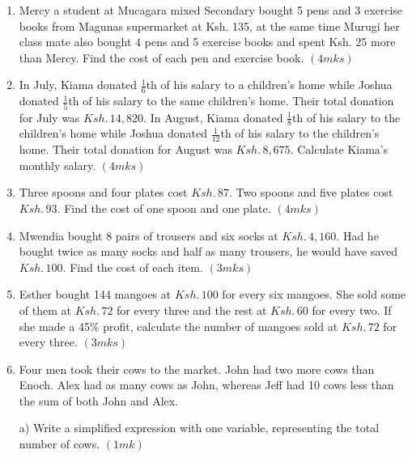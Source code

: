 \documentclass[
  letterpaper,
  DIV=11,
  numbers=noendperiod]{scrreprt}
\begin{document}
\begin{tcolorbox}
\begin{enumerate}
\def\labelenumi{\arabic{enumi}.}
\setcounter{enumi}{3}
\item
  Mercy a student at Mucagara mixed Secondary bought 5 pens and 3
  exercise books from Magunas supermarket at Ksh. 135, at the same time
  Murugi her class mate also bought 4 pens and 5 exercise books and
  spent Ksh. 25 more than Mercy. Find the cost of each pen and exercise
  book. \hspace{13.2 cm} \((4mks)\)
\item
  In July, Kiama donated \(\frac{1}{6}\)th of his salary to a children's
  home while Joshua donated \(\frac{1}{5}\)th of his salary to the same
  children's home. Their total donation for July was \(Ksh.\, 14,820\).
  In August, Kiama donated \(\frac{1}{8}\)th of his salary to the
  children's home while Joshua donated \(\frac{1}{12}\)th of his salary
  to the children's home. Their total donation for August was
  \(Ksh.\, 8,675\). Calculate Kiama's monthly salary. \hspace{13.1 cm}
  \((4mks)\)
\item
  Three spoons and four plates cost \(Ksh. \,87\). Two spoons and five
  plates cost \(Ksh.\, 93\). Find the cost of one spoon and one plate.
  \hspace{9cm} \((4mks)\)
\item
  Mwendia bought 8 pairs of trousers and six socks at \(Ksh.\, 4,160\).
  Had he bought twice as many socks and half as many trousers, he would
  have saved \(Ksh.\, 100\). Find the cost of each item. \hspace{14.3cm}
  \((3mks)\)
\item
  Esther bought 144 mangoes at \(Ksh.\, 100\) for every six mangoes. She
  sold some of them at \(Ksh.\, 72\) for every three and the rest at
  \(Ksh.\, 60\) for every two. If she made a 45\% profit, calculate the
  number of mangoes sold at \(Ksh.\, 72\) for every three.
  \hspace{7.1cm} \((3mks)\)
\item
  Four men took their cows to the market. John had two more cows than
  Enoch. Alex had as many cows as John, whereas Jeff had 10 cows less
  than the sum of both John and Alex.

  a) Write a simplified expression with one variable, representing the
  total number of cows. \hspace{13.6cm} \((1mk)\)


\end{enumerate}
\end{tcolorbox}
\end{document}
